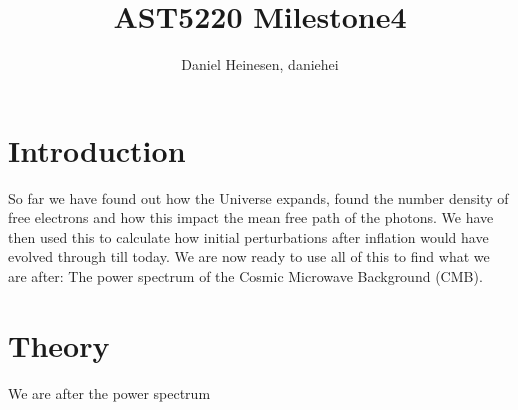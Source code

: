 \documentclass[a4paper,norsk, 10pt]{article}
\title{AST5220 Milestone4}
\author{Daniel Heinesen, daniehei}
\begin{document}
\maketitle
\section{Introduction}
So far we have found out how the Universe expands, found the number density of free electrons and how this impact the mean free path of the photons. We have then used this to calculate how initial perturbations after inflation would have evolved through till today. We are now ready to use all of this to find what we are after: The power spectrum of the Cosmic Microwave Background (CMB). 


\section{Theory}
We are after the power spectrum
\end{document}
